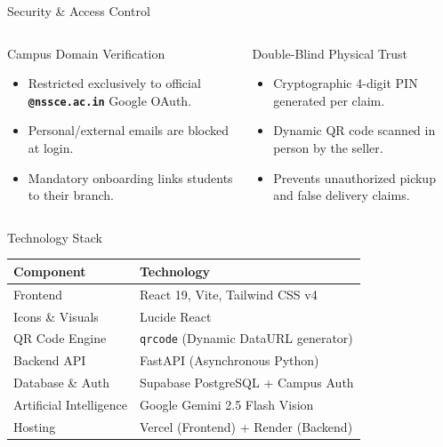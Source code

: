\documentclass{beamer}
\begin{document}
\begin{frame}{Security \& Access Control}

\begin{columns}[T]

\begin{block}{Campus Domain Verification}
\small
\begin{itemize}
    \item Restricted exclusively to official \textbf{\texttt{@nssce.ac.in}} Google OAuth.
    \item Personal/external emails are blocked at login.
    \item Mandatory onboarding links students to their branch.
\end{itemize}
\end{block}

\begin{block}{Double-Blind Physical Trust}
\small
\begin{itemize}
    \item Cryptographic 4-digit PIN generated per claim.
    \item Dynamic QR code scanned in person by the seller.
    \item Prevents unauthorized pickup and false delivery claims.
\end{itemize}
\end{block}

\end{columns}

\end{frame}


\begin{frame}{Technology Stack}

\begin{center}
\small
\begin{tabular}{|l|l|}
\hline
\textbf{Component} & \textbf{Technology} \\
\hline
Frontend & React 19, Vite, Tailwind CSS v4 \\
\hline
Icons \& Visuals & Lucide React \\
\hline
QR Code Engine & \texttt{qrcode} (Dynamic DataURL generator) \\
\hline
Backend API & FastAPI (Asynchronous Python) \\
\hline
Database \& Auth & Supabase PostgreSQL + Campus Auth \\
\hline
Artificial Intelligence & Google Gemini 2.5 Flash Vision \\
\hline
Hosting & Vercel (Frontend) + Render (Backend) \\
\hline
\end{tabular}
\end{center}

\end{frame}
\end{document}
